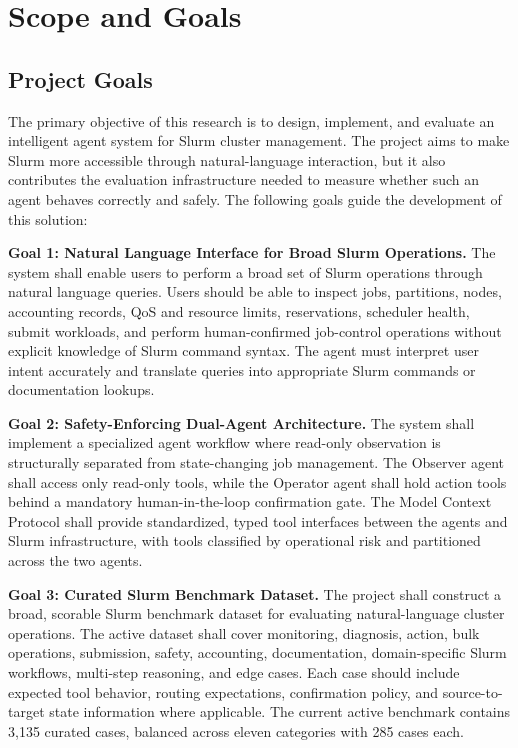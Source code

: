 \section{Scope and Goals}
\label{sec:scope-goals}

\subsection{Project Goals}

The primary objective of this research is to design, implement, and evaluate an intelligent agent system for Slurm cluster management. The project aims to make Slurm more accessible through natural-language interaction, but it also contributes the evaluation infrastructure needed to measure whether such an agent behaves correctly and safely. The following goals guide the development of this solution:

\textbf{Goal 1: Natural Language Interface for Broad Slurm Operations.} The system shall enable users to perform a broad set of Slurm operations through natural language queries. Users should be able to inspect jobs, partitions, nodes, accounting records, QoS and resource limits, reservations, scheduler health, submit workloads, and perform human-confirmed job-control operations without explicit knowledge of Slurm command syntax. The agent must interpret user intent accurately and translate queries into appropriate Slurm commands or documentation lookups.

\textbf{Goal 2: Safety-Enforcing Dual-Agent Architecture.} The system shall implement a specialized agent workflow where read-only observation is structurally separated from state-changing job management. The Observer agent shall access only read-only tools, while the Operator agent shall hold action tools behind a mandatory human-in-the-loop confirmation gate. The Model Context Protocol shall provide standardized, typed tool interfaces between the agents and Slurm infrastructure, with tools classified by operational risk and partitioned across the two agents.

\textbf{Goal 3: Curated Slurm Benchmark Dataset.} The project shall construct a broad, scorable Slurm benchmark dataset for evaluating natural-language cluster operations. The active dataset shall cover monitoring, diagnosis, action, bulk operations, submission, safety, accounting, documentation, domain-specific Slurm workflows, multi-step reasoning, and edge cases. Each case should include expected tool behavior, routing expectations, confirmation policy, and source-to-target state information where applicable. The current active benchmark contains 3,135 curated cases, balanced across eleven categories with 285 cases each.

